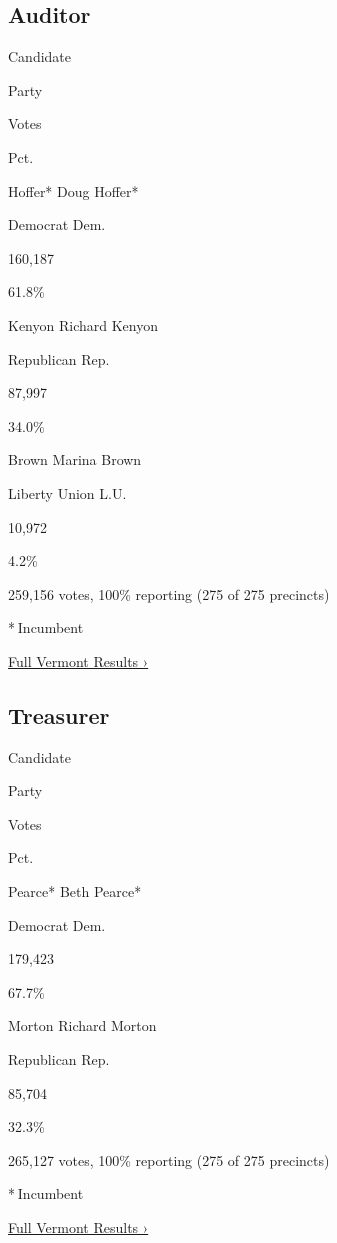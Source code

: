 \hypertarget{auditor}{%
\subsection{Auditor}\label{auditor}}

Candidate

Party

Votes

Pct.

 Hoffer* Doug Hoffer*

Democrat Dem.

160,187

61.8\%

 Kenyon Richard Kenyon

Republican Rep.

87,997

34.0\%

 Brown Marina Brown

Liberty Union L.U.

10,972

4.2\%

259,156 votes, 100\% reporting (275 of 275 precincts)

* Incumbent

\href{https://www.nytimes3xbfgragh.onion/interactive/2018/11/06/us/elections/results-vermont-elections.html}{Full
Vermont Results ›}

\hypertarget{treasurer}{%
\subsection{Treasurer}\label{treasurer}}

Candidate

Party

Votes

Pct.

 Pearce* Beth Pearce*

Democrat Dem.

179,423

67.7\%

 Morton Richard Morton

Republican Rep.

85,704

32.3\%

265,127 votes, 100\% reporting (275 of 275 precincts)

* Incumbent

\href{https://www.nytimes3xbfgragh.onion/interactive/2018/11/06/us/elections/results-vermont-elections.html}{Full
Vermont Results ›}

